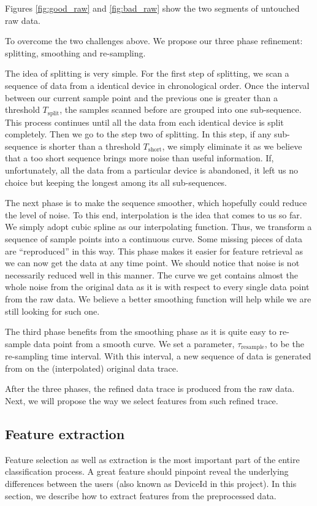 \documentclass{article} %
\begin{document}
Figures \ref{fig:good_raw} and \ref{fig:bad_raw} show the two segments of untouched raw data. 

To overcome the two challenges above. We propose our three phase refinement: splitting, smoothing and re-sampling.

The idea of splitting is very simple. For the first step of splitting, we scan a sequence of data from a identical device in chronological order. Once the interval between our current sample point and the previous one is greater than a threshold $T_\mathrm{split}$, the samples scanned before are grouped into one sub-sequence. This process continues until all the data from each identical device is split completely. Then we go to the step two of splitting. In this step, if any sub-sequence is shorter than a threshold $T_\mathrm{short}$, we simply eliminate it as we believe that a too short sequence brings more noise than useful information. If, unfortunately, all the data from a particular device is abandoned, it left us no choice but keeping the longest among its all sub-sequences.

The next phase is to make the sequence smoother, which hopefully could reduce the level of noise. To this end, interpolation is the idea that comes to us so far. We simply adopt cubic spline as our interpolating function. Thus, we transform a sequence of sample points into a continuous curve. Some missing pieces of data are ``reproduced'' in this way. This phase makes it easier for feature retrieval as we can now get the data at any time point. We should notice that noise is not necessarily reduced well in this manner. The curve we get contains almost the whole noise from the original data as it is with respect to every single data point from the raw data. We believe a better smoothing function will help while we are still looking for such one.

The third phase benefits from the smoothing phase as it is quite easy to re-sample data point from a smooth curve. We set a parameter, $\tau_\mathrm{resample}$, to be the re-sampling time interval. With this interval, a new sequence of data is generated from on the (interpolated) original data trace.

After the three phases, the refined data trace is produced from the raw data. Next, we will propose the way we select features from such refined trace.

\subsection{Feature extraction}
Feature selection as well as extraction is the most important part of the entire classification process. A great feature should pinpoint reveal the underlying differences between the users (also known as DeviceId in this project). In this section, we describe how to extract features from the preprocessed data.
\end{document}
